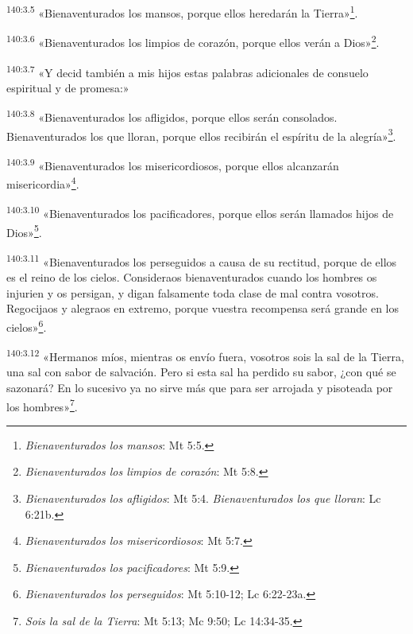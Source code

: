 \par 
\textsuperscript{140:3.5} «Bienaventurados los mansos, porque ellos heredarán la Tierra»\footnote{\textit{Bienaventurados los mansos}: Mt 5:5.}.

\par 
\textsuperscript{140:3.6} «Bienaventurados los limpios de corazón, porque ellos verán a Dios»\footnote{\textit{Bienaventurados los limpios de corazón}: Mt 5:8.}.

\par 
\textsuperscript{140:3.7} «Y decid también a mis hijos estas palabras adicionales de consuelo espiritual y de promesa:»

\par 
\textsuperscript{140:3.8} «Bienaventurados los afligidos, porque ellos serán consolados. Bienaventurados los que lloran, porque ellos recibirán el espíritu de la alegría»\footnote{\textit{Bienaventurados los afligidos}: Mt 5:4. \textit{Bienaventurados los que lloran}: Lc 6:21b.}.

\par 
\textsuperscript{140:3.9} «Bienaventurados los misericordiosos, porque ellos alcanzarán misericordia»\footnote{\textit{Bienaventurados los misericordiosos}: Mt 5:7.}.

\par 
\textsuperscript{140:3.10} «Bienaventurados los pacificadores, porque ellos serán llamados hijos de Dios»\footnote{\textit{Bienaventurados los pacificadores}: Mt 5:9.}.

\par 
\textsuperscript{140:3.11} «Bienaventurados los perseguidos a causa de su rectitud, porque de ellos es el reino de los cielos. Consideraos bienaventurados cuando los hombres os injurien y os persigan, y digan falsamente toda clase de mal contra vosotros. Regocijaos y alegraos en extremo, porque vuestra recompensa será grande en los cielos»\footnote{\textit{Bienaventurados los perseguidos}: Mt 5:10-12; Lc 6:22-23a.}.

\par 
\textsuperscript{140:3.12} «Hermanos míos, mientras os envío fuera, vosotros sois la sal de la Tierra, una sal con sabor de salvación. Pero si esta sal ha perdido su sabor, ¿con qué se sazonará? En lo sucesivo ya no sirve más que para ser arrojada y pisoteada por los hombres»\footnote{\textit{Sois la sal de la Tierra}: Mt 5:13; Mc 9:50; Lc 14:34-35.}.

